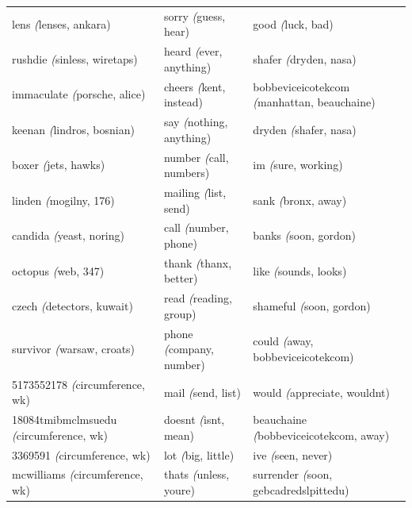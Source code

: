 \begin{table}[]
\begin{tabular}{lll}
		lens \textit({lenses, ankara)}                  & sorry \textit({guess, hear)}              & good \textit({luck, bad)}                           \\
		rushdie \textit({sinless, wiretaps)}            & heard \textit({ever, anything)}           & shafer \textit({dryden, nasa)}                      \\
		immaculate \textit({porsche, alice)}            & cheers \textit({kent, instead)}           & bobbeviceicotekcom \textit({manhattan, beauchaine)} \\
		keenan \textit({lindros, bosnian)}              & say \textit({nothing, anything)}          & dryden \textit({shafer, nasa)}                      \\
		boxer \textit({jets, hawks)}                    & number \textit({call, numbers)}           & im \textit({sure, working)}                         \\
		linden \textit({mogilny, 176)}                  & mailing \textit({list, send)}             & sank \textit({bronx, away)}                         \\
		candida \textit({yeast, noring)}                & call \textit({number, phone)}             & banks \textit({soon, gordon)}                       \\
		octopus \textit({web, 347)}                     & thank \textit({thanx, better)}            & like \textit({sounds, looks)}                       \\
		czech \textit({detectors, kuwait)}              & read \textit({reading, group)}            & shameful \textit({soon, gordon)}                    \\
		survivor \textit({warsaw, croats)}              & phone \textit({company, number)}          & could \textit({away, bobbeviceicotekcom)}           \\
		5173552178 \textit({circumference, wk)}         & mail \textit({send, list)}                & would \textit({appreciate, wouldnt)}                \\
		18084tmibmclmsuedu \textit({circumference, wk)} & doesnt \textit({isnt, mean)}              & beauchaine \textit({bobbeviceicotekcom, away)}      \\
		3369591 \textit({circumference, wk)}            & lot \textit({big, little)}                & ive \textit({seen, never)}                          \\
		mcwilliams \textit({circumference, wk)}         & thats \textit({unless, youre)}            & surrender \textit({soon, gebcadredslpittedu)}       \\

\end{tabular}
\end{table}
